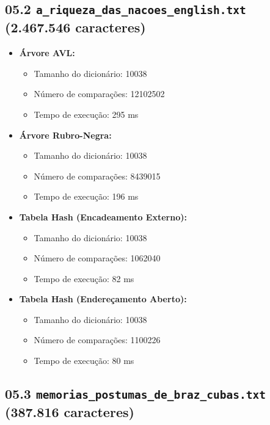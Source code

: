 \documentclass{article}
\begin{document}
\subsection*{05.2 \texttt{a\_riqueza\_das\_nacoes\_english.txt} (2.467.546 caracteres)}

\begin{itemize}
    \item \textbf{Árvore AVL:}
    \begin{itemize}
        \item Tamanho do dicionário: 10038
        \item Número de comparações: 12102502
        \item Tempo de execução: 295 ms
    \end{itemize}
    
    \item \textbf{Árvore Rubro-Negra:}
    \begin{itemize}
        \item Tamanho do dicionário: 10038
        \item Número de comparações: 8439015
        \item Tempo de execução: 196 ms
    \end{itemize}
    
    \item \textbf{Tabela Hash (Encadeamento Externo):}
    \begin{itemize}
        \item Tamanho do dicionário: 10038
        \item Número de comparações: 1062040
        \item Tempo de execução: 82 ms
    \end{itemize}
    
    \item \textbf{Tabela Hash (Endereçamento Aberto):}
    \begin{itemize}
        \item Tamanho do dicionário: 10038
        \item Número de comparações: 1100226
        \item Tempo de execução: 80 ms
    \end{itemize}
\end{itemize}

\subsection*{05.3 \texttt{memorias\_postumas\_de\_braz\_cubas.txt} (387.816 caracteres)}
\end{document}

